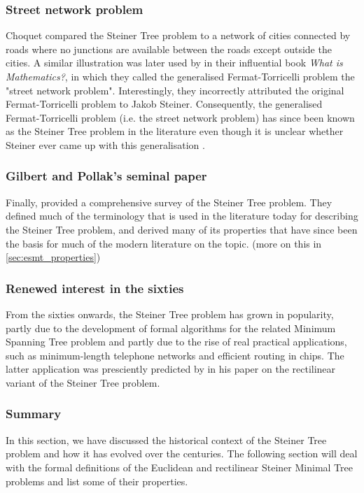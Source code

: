 \documentclass{l4proj}
\begin{document}
\subsubsection{Street network problem}
Choquet compared the Steiner Tree problem to a network of cities connected by roads where no junctions are available between the roads except outside the cities.
A similar illustration was later used by \cite{Courant_Robbins} in their influential book \textit{What is Mathematics?}, in which they called the generalised Fermat-Torricelli problem the "street network problem". Interestingly, they incorrectly attributed the original Fermat-Torricelli problem to Jakob Steiner. Consequently, the generalised Fermat-Torricelli problem (i.e. the street network problem) has since been known as the Steiner Tree problem in the literature even though it is unclear whether Steiner ever came up with this generalisation \citep{Brazil2014}.

\subsubsection{Gilbert and Pollak's seminal paper}
Finally, \cite{Gilbert1968SteinerMT} provided a comprehensive survey of the Steiner Tree problem. They defined much of the terminology that is used in the literature today for describing the Steiner Tree problem, and derived many of its properties that have since been the basis for much of the modern literature on the topic. (more on this in \ref{sec:esmt_properties})

\subsubsection{Renewed interest in the sixties}
From the sixties onwards, the Steiner Tree problem has grown in popularity, partly due to the development of formal algorithms for the related Minimum Spanning Tree problem and partly due to the rise of real practical applications, such as minimum-length telephone networks and efficient routing in chips. The latter application was presciently predicted by \cite{Hanan} in his paper on the rectilinear variant of the Steiner Tree problem.

\subsubsection{Summary}
In this section, we have discussed the historical context of the Steiner Tree problem and how it has evolved over the centuries. The following section will deal with the formal definitions of the Euclidean and rectilinear Steiner Minimal Tree problems and list some of their properties.
\end{document}
